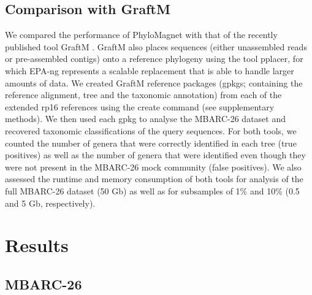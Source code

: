 \documentclass{bioinfo}
\begin{document}
\begin{methods}
\subsection{Comparison with GraftM}
We compared the performance of PhyloMagnet with that of the recently published tool GraftM \citep{Boyd2018}. GraftM also places sequences (either unassembled reads or pre-assembled contigs) onto a reference phylogeny using the tool pplacer, for which EPA-ng represents a scalable replacement that is able to handle larger amounts of data.
We created GraftM reference packages (gpkgs; containing the reference alignment, tree and the taxonomic annotation) from each of the extended rp16 references using the create command (see supplementary methods). We then used each gpkg to analyse the MBARC-26 dataset and recovered taxonomic classifications of the query sequences.
For both tools, we counted the number of genera that were correctly identified in each tree (true positives) as well as the number of genera that were identified even though they were not present in the MBARC-26 mock community (false positives). We also assessed the runtime and memory consumption of both tools for analysis of the full MBARC-26 dataset (50 Gb) as well as for subsamples of 1\% and 10\% (0.5 and 5 Gb, respectively).

\end{methods}

\section{Results}\label{results}
\subsection{MBARC-26}
\end{document}

